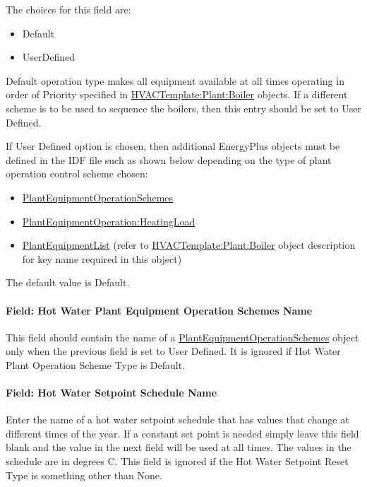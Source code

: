 The choices for this field are:

\begin{itemize}
\item
  Default
\item
  UserDefined
\end{itemize}

Default operation type makes all equipment available at all times operating in order of Priority specified in \hyperref[hvactemplateplantboiler]{HVACTemplate:Plant:Boiler} objects. If a different scheme is to be used to sequence the boilers, then this entry should be set to User Defined.

If User Defined option is chosen, then additional EnergyPlus objects must be defined in the IDF file such as shown below depending on the type of plant operation control scheme chosen:

\begin{itemize}
\item
  \hyperref[plantequipmentoperationschemes]{PlantEquipmentOperationSchemes}
\item
  \hyperref[plantequipmentoperationheatingload]{PlantEquipmentOperation:HeatingLoad}
\item
  \hyperref[plantequipmentlist]{PlantEquipmentList} (refer to \hyperref[hvactemplateplantboiler]{HVACTemplate:Plant:Boiler} object description for key name required in this object)
\end{itemize}

The default value is Default.

\paragraph{Field: Hot Water Plant Equipment Operation Schemes Name}\label{field-hot-water-plant-equipment-operation-schemes-name}

This field should contain the name of a \hyperref[plantequipmentoperationschemes]{PlantEquipmentOperationSchemes} object only when the previous field is set to User Defined. It is ignored if Hot Water Plant Operation Scheme Type is Default.

\paragraph{Field: Hot Water Setpoint Schedule Name}\label{field-hot-water-setpoint-schedule-name}

Enter the name of a hot water setpoint schedule that has values that change at different times of the year. If a constant set point is needed simply leave this field blank and the value in the next field will be used at all times. The values in the schedule are in degrees C. This field is ignored if the Hot Water Setpoint Reset Type is something other than None.

